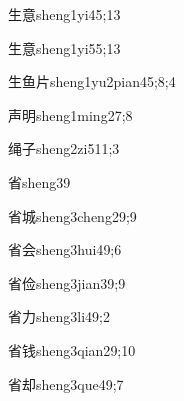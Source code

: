 \begin{verbete}{生意}{sheng1yi4}{5;13}
\end{verbete}

\begin{verbete}{生意}{sheng1yi5}{5;13}
\end{verbete}

\begin{verbete}{生鱼片}{sheng1yu2pian4}{5;8;4}
\end{verbete}

\begin{verbete}{声明}{sheng1ming2}{7;8}
\end{verbete}

\begin{verbete}{绳子}{sheng2zi5}{11;3}
\end{verbete}

\begin{verbete}{省}{sheng3}{9}
\end{verbete}

\begin{verbete}{省城}{sheng3cheng2}{9;9}
\end{verbete}

\begin{verbete}{省会}{sheng3hui4}{9;6}
\end{verbete}

\begin{verbete}{省俭}{sheng3jian3}{9;9}
\end{verbete}

\begin{verbete}{省力}{sheng3li4}{9;2}
\end{verbete}

\begin{verbete}{省钱}{sheng3qian2}{9;10}
\end{verbete}

\begin{verbete}{省却}{sheng3que4}{9;7}
\end{verbete}

